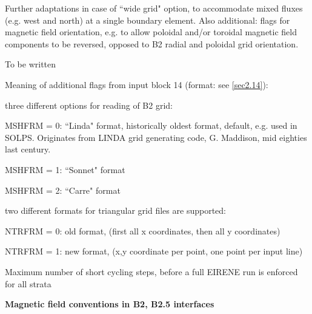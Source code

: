 \noindent
Further adaptations in case of ``wide grid" option, to accommodate   mixed fluxes (e.g. west and north)
at a single boundary element.
Also additional: flags for magnetic field orientation, e.g. to allow poloidal and/or toroidal magnetic field components
to be reversed, opposed to B2 radial and poloidal grid orientation.

To be written

Meaning of additional flags from input block 14  (format: see \ref{sec2.14}):
\begin{list}{ }{}
\item[{\bf MSHFRM}]
three different options for reading of B2 grid:

MSHFRM = 0: ``Linda" format, historically oldest format, default, e.g. used in SOLPS.
Originates from LINDA grid generating code, G. Maddison, mid eighties last century.

MSHFRM = 1: ``Sonnet" format

MSHFRM = 2: ``Carre" format

\item[{\bf NTRFRM}]
two different formats for triangular grid files are supported:

NTRFRM = 0:  old format, (first all x coordinates, then all y coordinates)

NTRFRM = 1:  new format, (x,y coordinate per point, one point per input line)
\item[{\bf NFULL}]
Maximum number of short cycling steps, before a full EIRENE run is enforced for all strata
\end{list}

\textbf{Magnetic field conventions in B2, B2.5 interfaces}

